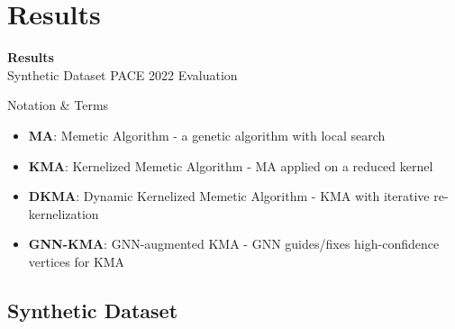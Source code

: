 \documentclass[aspectratio=169]{beamer}
\begin{document}
\section{Results}
\begin{frame}[plain]
	\centering
	\vspace{1.0cm}
	{\Huge \textbf{Results}}\\[6pt]
	{\Large Synthetic Dataset \quad PACE 2022 \quad Evaluation}
\end{frame}

\begin{frame}{Notation \& Terms}
	\begin{itemize}
		\item \textbf{MA}: Memetic Algorithm - a genetic algorithm with local search
		\item \textbf{KMA}: Kernelized Memetic Algorithm - MA applied on a reduced kernel
		\item \textbf{DKMA}: Dynamic Kernelized Memetic Algorithm - KMA with iterative re-kernelization
		\item \textbf{GNN-KMA}: GNN-augmented KMA - GNN guides/fixes high-confidence vertices for KMA
	\end{itemize}
\end{frame}

\subsection{Synthetic Dataset}
\end{document}
